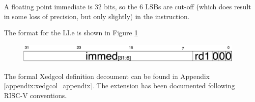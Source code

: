     A floating point immediate is 32 bits, so the 6 \glspl{LSB} are cut-off (which does result in some loss of precision, but only slightly) in the instruction.

    The format for the LI.e is shown in Figure \ref{fig:lie}

    \begin{figure}[H]
    \begin{center}
    \includegraphics[width=0.85\linewidth]{chapters/chapter4/img/lie.png} 
    \label{fig:lie}
    \end{center}
    \end{figure}

    The formal Xedgcol definition decoument can be found in Appendix \ref{appendix:xedgcol_appendix}. The extension has been documented following RISC-V conventions.